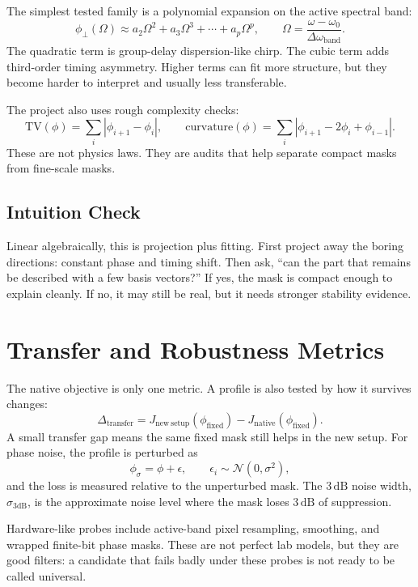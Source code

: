 \documentclass[11pt]{article}
\begin{document}
The simplest tested family is a polynomial expansion on the active spectral
band:
\[
    \phi_{\perp}(\Omega)
    \approx
    a_2\Omega^2+a_3\Omega^3+\cdots+a_p\Omega^p,
    \qquad
    \Omega=\frac{\omega-\omega_0}{\Delta\omega_{\mathrm{band}}}.
\]
The quadratic term is group-delay dispersion-like chirp. The cubic term adds
third-order timing asymmetry. Higher terms can fit more structure, but they
become harder to interpret and usually less transferable.

The project also uses rough complexity checks:
\[
    \mathrm{TV}(\phi)=\sum_i|\phi_{i+1}-\phi_i|,
    \qquad
    \mathrm{curvature}(\phi)=\sum_i|\phi_{i+1}-2\phi_i+\phi_{i-1}|.
\]
These are not physics laws. They are audits that help separate compact masks
from fine-scale masks.

\subsection*{Intuition Check}

Linear algebraically, this is projection plus fitting. First project away the
boring directions: constant phase and timing shift. Then ask, ``can the part
that remains be described with a few basis vectors?'' If yes, the mask is
compact enough to explain cleanly. If no, it may still be real, but it needs stronger
stability evidence.

\section{Transfer and Robustness Metrics}

The native objective is only one metric. A profile is also tested by how it
survives changes:
\[
    \Delta_{\mathrm{transfer}}
    =
    J_{\mathrm{new\ setup}}(\phi_{\mathrm{fixed}})
    -
    J_{\mathrm{native}}(\phi_{\mathrm{fixed}}).
\]
A small transfer gap means the same fixed mask still helps in the new setup.
For phase noise, the profile is perturbed as
\[
    \phi_{\sigma}=\phi+\epsilon,
    \qquad
    \epsilon_i\sim\mathcal{N}(0,\sigma^2),
\]
and the loss is measured relative to the unperturbed mask. The
\(3\,\mathrm{dB}\) noise width, \(\sigma_{3\mathrm{dB}}\), is the approximate
noise level where the mask loses \(3\,\mathrm{dB}\) of suppression.

Hardware-like probes include active-band pixel resampling, smoothing, and
wrapped finite-bit phase masks. These are not perfect lab models, but they are
good filters: a candidate that fails badly under these probes is not ready to
be called universal.
\end{document}
